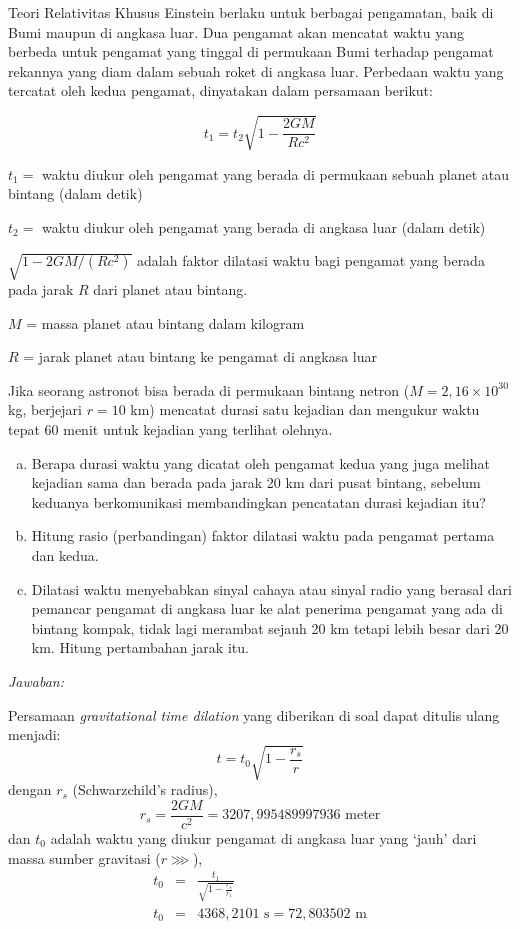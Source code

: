\documentclass[11pt,fleqn]{exam}
\begin{document}
\begin{questions}
\begin{enumerate}[a).]
\end{enumerate}


\vspace{0.5cm}
\question Teori Relativitas Khusus Einstein berlaku untuk berbagai pengamatan, baik di Bumi maupun di angkasa luar. Dua pengamat akan mencatat waktu yang berbeda untuk pengamat yang tinggal di permukaan Bumi terhadap pengamat rekannya yang diam dalam sebuah roket di angkasa luar. Perbedaan waktu yang tercatat oleh kedua pengamat, dinyatakan dalam persamaan berikut:

$$t_1 = t_2 \sqrt{ 1 - \frac{2GM}{Rc^2} }$$

$t_1 = $ waktu diukur oleh pengamat yang berada di permukaan sebuah planet atau bintang (dalam detik)

$t_2 = $ waktu diukur oleh pengamat yang berada di angkasa luar (dalam detik)

$\sqrt{1 - 2GM/(Rc^2)}$ adalah faktor dilatasi waktu bagi pengamat yang berada pada jarak $R$ dari planet atau bintang.

$M$ = massa planet atau bintang dalam kilogram

$R$ = jarak planet atau bintang ke pengamat di angkasa luar

Jika seorang astronot bisa berada di permukaan bintang netron ($M = 2,16 \times 10^{30}$ kg, berjejari $r=10$ km) mencatat durasi satu kejadian dan mengukur waktu tepat 60 menit untuk kejadian yang terlihat olehnya.
\begin{enumerate}[a.]
\item Berapa durasi waktu yang dicatat oleh pengamat kedua yang juga melihat kejadian sama dan berada pada jarak 20 km dari pusat bintang, sebelum keduanya berkomunikasi membandingkan pencatatan durasi kejadian itu?
\item Hitung rasio (perbandingan) faktor dilatasi waktu pada pengamat pertama dan kedua.
\item Dilatasi waktu menyebabkan sinyal cahaya atau sinyal radio yang berasal dari pemancar pengamat di angkasa luar ke alat penerima pengamat yang ada di bintang kompak, tidak lagi merambat sejauh 20 km tetapi lebih besar dari 20 km. Hitung pertambahan jarak itu.
\end{enumerate}


\textit{Jawaban: }

Persamaan \textit{gravitational time dilation} yang diberikan di soal dapat ditulis ulang menjadi:
\begin{equation*}
t = t_0 \sqrt{1 - \frac{r_s}{r}} 
\end{equation*}
dengan $r_s$ (Schwarzchild's radius),
\begin{equation*}
r_s = \frac{2GM}{c^2} = 3207,995489997936 \text{   meter}
\end{equation*}
dan $t_0$ adalah waktu yang diukur pengamat di angkasa luar yang `jauh' dari massa sumber gravitasi ($r \ggg $),
\begin{eqnarray*}
	t_0 &=& \frac{t_1}{\sqrt{1 - \frac{r_s}{r_1}}}\\
	t_0 &=& 4368,2101 \text{   s} = 72,803502 \text{   m}
\end{eqnarray*}


\end{questions}
\end{document}
